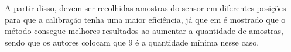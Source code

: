 \documentclass[acronym, symbols, table]{fei}
\begin{document}
			A partir disso, devem ser recolhidas amostras do sensor em diferentes posições para que a calibração tenha uma maior eficiência, já que em \textcite{menezes2020triaxial} é mostrado que o método consegue melhores resultados ao aumentar a quantidade de amostras, sendo que os autores colocam que 9 é a quantidade mínima nesse caso.
			
%			
%			
%			
			
\end{document}

